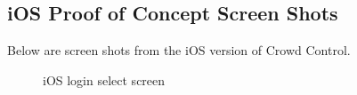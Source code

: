 \subsection{iOS Proof of Concept Screen Shots}

Below are screen shots from the iOS version of Crowd Control.


	\begin{figure}[!tbh]
	\begin{center}
	\end{center}
	\caption{iOS login select screen \label{iOSloginselectscreen}}
	\end{figure}

